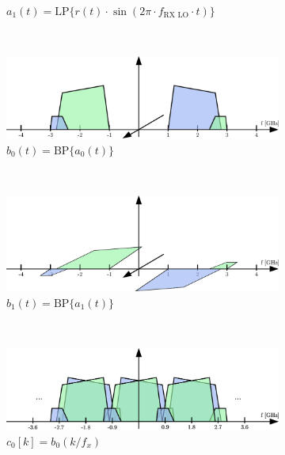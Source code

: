 \begin{figure}[h!]
\begin{subfigure}{0.45\textwidth}
    \caption{$a_1(t) = \text{LP}\{r(t) \cdot \sin(2\pi \cdot f_{\text{RX LO}} \cdot t)\}$}
    \label{fig:rx_2_freq_a_1}
  \end{subfigure}
  \vspace{4ex} \\
  \begin{subfigure}{0.45\textwidth}
    \centering
    \includegraphics[width=\textwidth]{figures/rx_2_freq_b_0}
    \caption{$b_0(t) = \text{BP}\{a_0(t)\}$}
    \label{fig:rx_2_freq_b_0}
  \end{subfigure}
  ~
  \begin{subfigure}{0.45\textwidth}
    \centering
    \includegraphics[width=\textwidth]{figures/rx_2_freq_b_1}
    \caption{$b_1(t) = \text{BP}\{a_1(t)\}$}
    \label{fig:rx_2_freq_b_1}
  \end{subfigure}
  \vspace{4ex} \\
  \begin{subfigure}{0.45\textwidth}
    \centering
    \includegraphics[width=\textwidth]{figures/rx_2_freq_c_0}
    \caption{$c_0[k] = b_0(k/f_x)$}
    \label{fig:rx_2_freq_c_0}
  \end{subfigure}
  ~
  \begin{subfigure}{0.45\textwidth}

\end{subfigure}
\end{figure}
